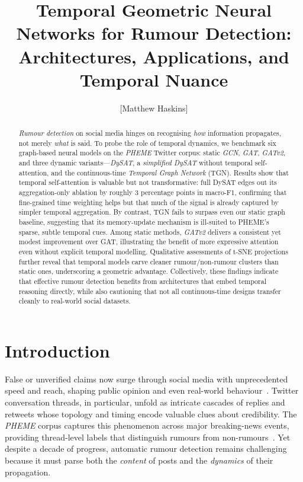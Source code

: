 \documentclass{cshonours}
\title{Temporal Geometric Neural Networks for Rumour Detection: Architectures, Applications, and Temporal Nuance}
\author{[Matthew Haskins]} %
\begin{document}
\maketitle

\begin{abstract}

\emph{Rumour detection} on social media hinges on recognising \emph{how} information propagates, not merely \emph{what} is said. To probe the role of temporal dynamics, we benchmark six graph-based neural models on the \emph{PHEME} Twitter corpus: static \emph{GCN}, \emph{GAT}, \emph{GATv2}, and three dynamic variants—\emph{DySAT}, a \emph{simplified DySAT} without temporal self-attention, and the continuous-time \emph{Temporal Graph Network} (TGN). Results show that temporal self-attention is valuable but not transformative: full DySAT edges out its aggregation-only ablation by roughly 3 percentage points in macro-F1, confirming that fine-grained time weighting helps but that much of the signal is already captured by simpler temporal aggregation. By contrast, TGN fails to surpass even our static graph baseline, suggesting that its memory-update mechanism is ill-suited to PHEME’s sparse, subtle temporal cues. Among static methods, \emph{GATv2} delivers a consistent yet modest improvement over GAT, illustrating the benefit of more expressive attention even without explicit temporal modelling. Qualitative assessments of t-SNE projections further reveal that temporal models carve cleaner rumour/non-rumour clusters than static ones, underscoring a geometric advantage. Collectively, these findings indicate that effective rumour detection benefits from architectures that embed temporal reasoning directly, while also cautioning that not all continuous-time designs transfer cleanly to real-world social datasets. 

\end{abstract}


\tableofcontents
\listoffigures

\chapter{Introduction}

False or unverified claims now surge through social media with unprecedented speed and reach, shaping public opinion and even real-world behaviour~\cite{vosoughi2018spread}.  Twitter conversation threads, in particular, unfold as intricate cascades of replies and retweets whose topology and timing encode valuable clues about credibility.  The \emph{PHEME} corpus captures this phenomenon across major breaking-news events, providing thread-level labels that distinguish rumours from non-rumours~\cite{zubiaga2016pheme}.  Yet despite a decade of progress, automatic rumour detection remains challenging because it must parse both the \emph{content} of posts and the \emph{dynamics} of their propagation.
\end{document}
